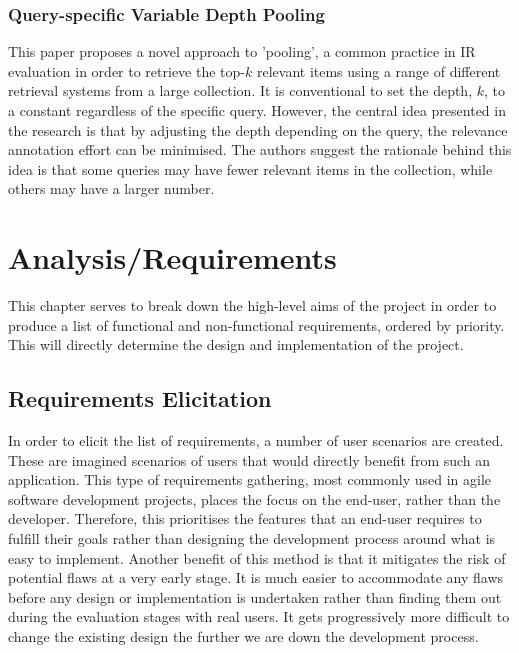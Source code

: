 \documentclass{l4proj}
\begin{document}
\subsection{Query-specific Variable Depth Pooling}
This paper proposes a novel approach to 'pooling', a common practice in IR evaluation in order to retrieve the top-$k$ relevant items using a range of different retrieval systems from a large collection. It is conventional to set the depth, $k$, to a constant regardless of the specific query. However, the central idea presented in the research is that by adjusting the depth depending on the query, the relevance annotation effort can be minimised. The authors suggest the rationale behind this idea is that some queries may have fewer relevant items in the collection, while others may have a larger number. 







\chapter{Analysis/Requirements}
This chapter serves to break down the high-level aims of the project in order to produce a list of functional and non-functional requirements, ordered by priority. This will directly determine the design and implementation of the project.

\section{Requirements Elicitation}
In order to elicit the list of requirements, a number of user scenarios are created. These are imagined scenarios of users that would directly benefit from such an application. This type of requirements gathering, most commonly used in agile software development projects, places the focus on the end-user, rather than the developer. Therefore, this prioritises the features that an end-user requires to fulfill their goals rather than designing the development process around what is easy to implement. Another benefit of this method is that it mitigates the risk of potential flaws at a very early stage. It is much easier to accommodate any flaws before any design or implementation is undertaken rather than finding them out during the evaluation stages with real users. It gets progressively more difficult to change the existing design the further we are down the development process.
\end{document}
